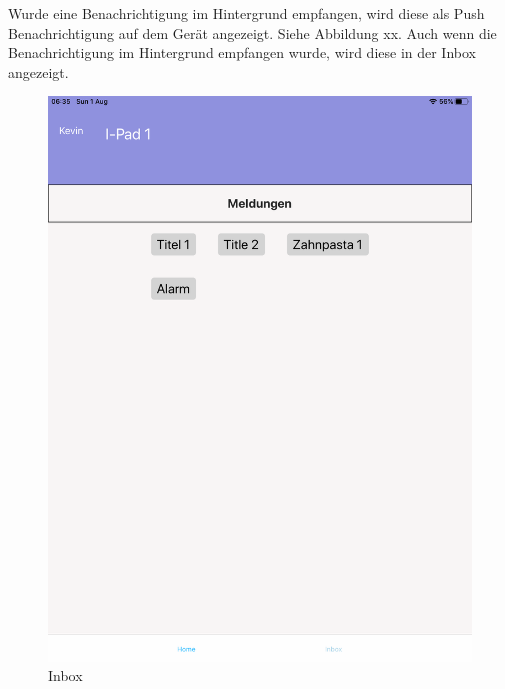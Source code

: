 Wurde eine Benachrichtigung im Hintergrund empfangen, wird diese als Push Benachrichtigung auf dem Gerät angezeigt.
Siehe Abbildung xx.
Auch wenn die Benachrichtigung im Hintergrund empfangen wurde, wird diese in der Inbox angezeigt.

\begin{figure}[h]
    \centering
    \begin{minipage}[b]{0.4\textwidth}
        \includegraphics[width=\textwidth]{graphics/screenshots/mobileclient/screenshot-homescreen}
        \caption{Inbox}
    \end{minipage}
    \hfill
    \begin{minipage}[b]{0.4\textwidth}

\end{minipage}
\end{figure}
